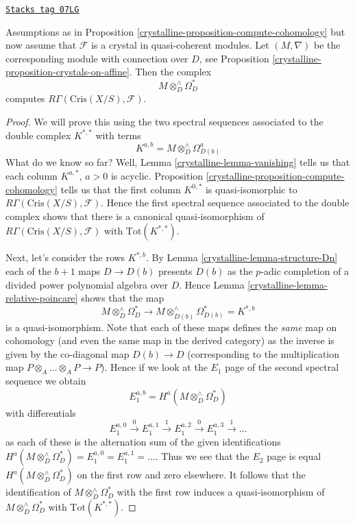 \begin{proposition}
\label{crystalline-proposition-compute-cohomology-crystal}
\href{https://stacks.math.columbia.edu/tag/07LG}{\texttt{Stacks tag 07LG}}

Assumptions as in Proposition \ref{crystalline-proposition-compute-cohomology}
but now assume that $\mathcal{F}$ is a crystal in quasi-coherent modules.
Let $(M, \nabla)$ be the corresponding module with connection over $D$, see
Proposition \ref{crystalline-proposition-crystals-on-affine}. Then the complex
$$
M \otimes^\wedge_D \Omega^*_D
$$
computes $R\Gamma(\text{Cris}(X/S), \mathcal{F})$.
\end{proposition}

\begin{proof}

We will prove this using the two spectral sequences associated to the
double complex $K^{*, *}$ with terms
$$
K^{a, b} = M \otimes_D^\wedge \Omega^a_{D(b)}
$$
What do we know so far? Well, Lemma \ref{crystalline-lemma-vanishing}
tells us that each column $K^{a, *}$, $a > 0$ is acyclic.
Proposition \ref{crystalline-proposition-compute-cohomology} tells us that
the first column $K^{0, *}$ is quasi-isomorphic to
$R\Gamma(\text{Cris}(X/S), \mathcal{F})$.
Hence the first spectral sequence associated to the double complex
shows that there is a canonical quasi-isomorphism of
$R\Gamma(\text{Cris}(X/S), \mathcal{F})$ with
$\text{Tot}(K^{*, *})$.

\medskip\noindent
Next, let's consider the rows $K^{*, b}$. By
Lemma \ref{crystalline-lemma-structure-Dn}
each of the $b + 1$ maps $D \to D(b)$ presents $D(b)$ as the $p$-adic
completion of a divided power polynomial algebra over $D$.
Hence Lemma \ref{crystalline-lemma-relative-poincare} shows that the map
$$
M \otimes^\wedge_D\Omega^*_D
\longrightarrow
M \otimes^\wedge_{D(b)} \Omega^*_{D(b)} = K^{*, b}
$$
is a quasi-isomorphism. Note that each of these maps defines the {\it same}
map on cohomology (and even the same map in the derived category) as
the inverse is given by the co-diagonal map $D(b) \to D$ (corresponding
to the multiplication map $P \otimes_A \ldots \otimes_A P \to P$).
Hence if we look at the $E_1$ page of the second spectral sequence
we obtain
$$
E_1^{a, b} = H^a(M \otimes^\wedge_D\Omega^*_D)
$$
with differentials
$$
E_1^{a, 0} \xrightarrow{0}
E_1^{a, 1} \xrightarrow{1}
E_1^{a, 2} \xrightarrow{0}
E_1^{a, 3} \xrightarrow{1} \ldots
$$
as each of these is the alternation sum of the given identifications
$H^a(M \otimes^\wedge_D\Omega^*_D) = E_1^{a, 0} = E_1^{a, 1} = \ldots$.
Thus we see that the $E_2$ page is equal $H^a(M \otimes^\wedge_D\Omega^*_D)$
on the first row and zero elsewhere. It follows that the identification
of $M \otimes^\wedge_D\Omega^*_D$ with the first row induces a
quasi-isomorphism of $M \otimes^\wedge_D\Omega^*_D$ with
$\text{Tot}(K^{*, *})$.
\end{proof}

